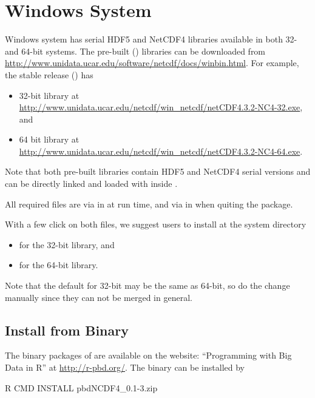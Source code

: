 
\section[Windows System]{Windows System}
\label{sec:windows_system}

Windows system has serial HDF5 and NetCDF4 libraries available in
both 32- and 64-bit systems. The pre-built () libraries can be
downloaded from
\url{http://www.unidata.ucar.edu/software/netcdf/docs/winbin.html}.
For example, the stable release () has
\begin{itemize}
\item 32-bit library at \\
\url{http://www.unidata.ucar.edu/netcdf/win_netcdf/netCDF4.3.2-NC4-32.exe}, and
\item 64 bit library at \\
\url{http://www.unidata.ucar.edu/netcdf/win_netcdf/netCDF4.3.2-NC4-64.exe}.
\end{itemize}
Note that both pre-built libraries contain HDF5 and NetCDF4 serial versions
and can be directly linked and loaded with  inside .

All required  files are via  in
 at run time, and via  in
 when quiting the package.

With a few click on both  files,
we suggest users to install at the system directory
\begin{itemize}
\item
{} for the 32-bit library, and
\item
{} for the 64-bit library.
\end{itemize}
Note that the default for 32-bit may be the same as 64-bit, so do the change
manually since they can not be merged in general.


\subsection[Install from Binary]{Install from Binary}
\label{sec:install_from_binary}

The binary packages of  are available on the website:
``Programming with Big Data in R'' at
\url{http://r-pbd.org/}.
The binary can be installed by
\begin{Command}
R CMD INSTALL pbdNCDF4_0.1-3.zip
\end{Command}

